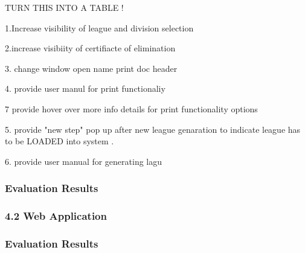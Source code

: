 TURN THIS INTO A TABLE !

1.Increase visibility of league and division selection

2.increase visibiity of certifiacte of elimination

3. change window open name print doc header

4. provide user manul for print functionaliy

7 provide hover over more info details for print functionality options

5. provide "new step" pop up after new league genaration to indicate league has to be LOADED into system .

6. provide user manual for generating lagu


\subsubsection{Evaluation Results}

\subsubsection{4.2 Web Application}

\subsubsection{Evaluation Results}


















































